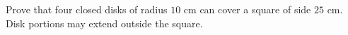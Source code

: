 Prove that four closed disks of radius $10$ cm can cover a square of side $25$ cm. Disk portions may extend outside the square.
